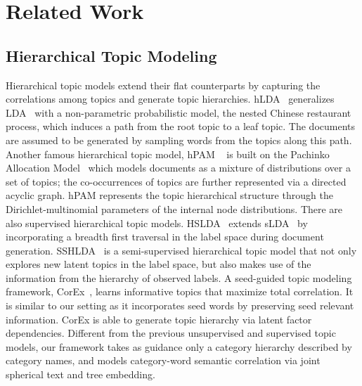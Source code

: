 \documentclass[sigconf]{acmart}
\theoremstyle{definition}
\begin{document}
 


\section{Related Work}


\subsection{Hierarchical Topic Modeling}
Hierarchical topic models extend their flat counterparts by capturing the correlations among topics and generate topic hierarchies. hLDA~\cite{Blei2003HierarchicalTM} generalizes LDA~\cite{Blei2003LatentDA} with a non-parametric probabilistic model, the nested Chinese restaurant
process, which induces a path from the root topic to a leaf topic. The documents are assumed to be generated by sampling words from the topics along this path. Another famous hierarchical topic model, hPAM ~\cite{Mimno2007MixturesOH} is built on  the Pachinko Allocation Model~\cite{li2006pachinko} which models documents as a mixture of distributions over a set of topics; the co-occurrences of topics are further represented via a directed acyclic graph. hPAM represents the topic hierarchical structure through the Dirichlet-multinomial parameters of the internal node distributions. There are also supervised hierarchical topic models. 
HSLDA~\cite{Perotte2011HierarchicallySL} extends sLDA~\cite{mcauliffe2008supervised} by incorporating a breadth first traversal in the label space during document generation. 
SSHLDA~\cite{Mao2012SSHLDAAS} is a semi-supervised hierarchical topic model that not only explores new latent topics in the label space, but also makes
use of the information from the hierarchy of observed labels. 
A seed-guided topic modeling framework, CorEx~\cite{Gallagher2017AnchoredCE}, learns informative topics that maximize total correlation. It is similar to our setting as it incorporates seed words by preserving seed relevant information. CorEx is able to generate topic hierarchy via latent factor dependencies. Different from the previous unsupervised and supervised topic models, our framework takes as guidance only a category hierarchy described by category names, and models category-word semantic correlation via joint spherical text and tree embedding.
\end{document}
